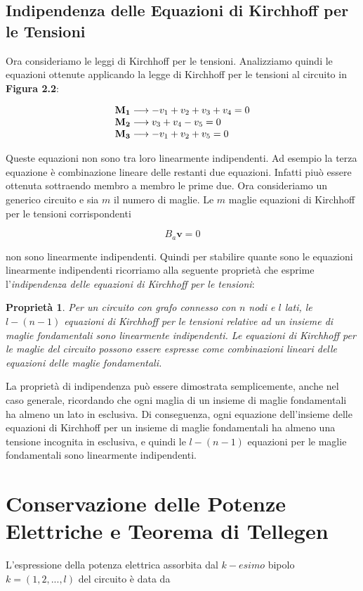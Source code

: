 \documentclass[a4paper]{report}
\newtheorem{prop}{Propriet\`a}
\begin{document}
\subsection{Indipendenza delle Equazioni di Kirchhoff per le Tensioni}

Ora consideriamo le leggi di Kirchhoff per le tensioni. Analizziamo
quindi le equazioni ottenute applicando la legge di Kirchhoff per le
tensioni al circuito in {\bf Figura 2.2}:

\[
\begin{array}{l l l}
  \mathbf{M_1}\longrightarrow -v_1+v_2+v_3+v_4=0\\
  \mathbf{M_2}\longrightarrow v_3+v_4-v_5=0\\
  \mathbf{M_3}\longrightarrow -v_1+v_2+v_5=0  
\end{array}  
\]

Queste equazioni non sono tra loro linearmente indipendenti. Ad
esempio la terza equazione \`e combinazione lineare delle restanti due
equazioni. Infatti piu\`o essere ottenuta sottraendo membro a membro
le prime due.
Ora consideriamo un generico circuito e sia $m$ il numero di
maglie. Le $m$ maglie equazioni di Kirchhoff per le tensioni
corrispondenti

\[
B_a\mathbf{v}=0
\]

non sono linearmente indipendenti. Quindi per stabilire quante sono le
equazioni linearmente indipendenti ricorriamo alla seguente
propriet\`a che esprime l'\emph{indipendenza delle equazioni di
  Kirchhoff per le tensioni}:

\begin{prop}
  Per un circuito con grafo connesso con $n$ nodi e $l$ lati, le
  $l-(n-1)$ equazioni di Kirchhoff per le tensioni relative ad un
  insieme di maglie fondamentali sono linearmente indipendenti. Le
  equazioni di Kirchhoff per le maglie del circuito possono essere
  espresse come combinazioni lineari delle equazioni delle maglie fondamentali.
\end{prop}

La propriet\`a di indipendenza pu\`o essere dimostrata semplicemente,
anche nel caso generale, ricordando che ogni maglia di un insieme di
maglie fondamentali ha almeno un lato in esclusiva. Di conseguenza,
ogni equazione dell'insieme delle equazioni di Kirchhoff per un
insieme di maglie fondamentali ha almeno una tensione incognita in
esclusiva, e quindi le $l-(n-1)$ equazioni per le maglie fondamentali
sono linearmente indipendenti.

\section{Conservazione delle Potenze Elettriche e Teorema di Tellegen}
L'espressione della potenza elettrica assorbita dal $k-esimo$ bipolo
$k=(1, 2,..., l)$ del circuito \`e data da
\end{document}
